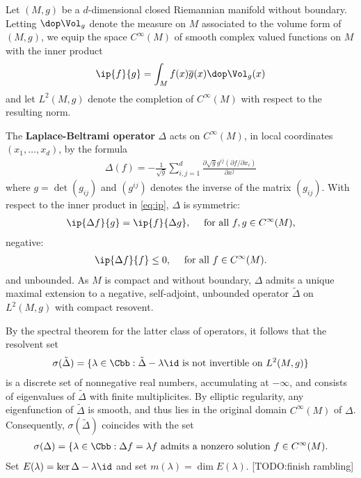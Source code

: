 \newpage
Let $(M,g)$ be a $d$-dimensional closed Riemannian manifold without boundary.  Letting $\dop \Vol_g$ denote the measure on $M$ associated to the volume form of $(M,g)$, we equip the space $C^\infty(M)$ of smooth complex valued functions on $M$ with the inner product
\begin{align}\label{eq:ip}
    \ip{f}{g} = \int_M f(x) \overline{g}(x) \dop \Vol_g(x)
\end{align}
and let $L^2(M,g)$ denote the completion of $C^\infty(M)$ with respect to the resulting norm.

The \textbf{Laplace-Beltrami operator} $\Delta$ acts on $C^\infty(M)$, in local coordinates $(x_1,\dots,x_d)$, by the formula
\begin{align}
    \Delta(f) = -\frac{1}{\sqrt{g}} \sum_{i,j=1}^d \frac{\partial \sqrt{g} g^{ij} (\partial f / \partial x_i)}{\partial x^j}
\end{align}
where $g = \det(g_{ij})$ and $(g^{ij})$ denotes the inverse of the matrix $(g_{ij})$. With respect to the inner product in \ref{eq:ip}, $\Delta$ is symmetric:
\begin{align*}
    \ip{\Delta f}{g} =\ip{ f}{\Delta g}, \quad \text{ for all $f,g \in C^\infty(M)$,}
\end{align*}
negative:
\begin{align*}
    \ip{\Delta f }{f} \leq 0, \quad \text{ for all $f \in C^\infty(M)$.}
\end{align*}
and unbounded. As $M$ is compact and without boundary, $\Delta$ admits a unique maximal extension to a negative, self-adjoint, unbounded operator  $\tilde{\Delta}$ on $L^2(M,g)$ with compact resovent.

By the spectral theorem for the latter class of operators, it follows that the resolvent set
\begin{align*}
    \sigma(\tilde{\Delta}) = \{ \lambda \in \Cbb : \tilde{\Delta} - \lambda \id \text{ is not invertible on $L^2(M,g)$}\}
\end{align*}
is a discrete set of nonnegative real numbers, accumulating at $-\infty$, and consists of eigenvalues of $\tilde{\Delta}$ with finite multiplicites. By elliptic regularity, any eigenfunction of $\tilde{\Delta}$ is smooth, and thus lies in the original domain $C^\infty(M)$ of $\Delta$. Consequently, $\sigma(\tilde{\Delta})$ coincides with the set
\begin{align*}
    \sigma(\Delta) = \{\lambda \in \Cbb : \Delta f  = \lambda f \text{ admits a nonzero  solution  $f \in C^\infty(M)$}.
\end{align*}
Set $E(\lambda) = \ker \Delta - \lambda \id$ and set $m(\lambda) = \dim E(\lambda)$. [TODO:finish rambling]

